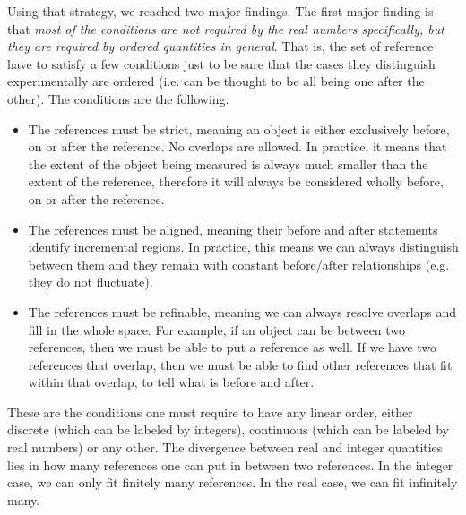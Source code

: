 \documentclass[12pt]{iopart}
\begin{document}
Using that strategy, we reached two major findings. The first major finding is that \emph{most of the conditions are not required by the real numbers specifically, but they are required by ordered quantities in general}. That is, the set of reference have to satisfy a few conditions just to be sure that the cases they distinguish experimentally are ordered (i.e. can be thought to be all being one after the other). The conditions are the following.
\begin{itemize}
	\item The references must be strict, meaning an object is either exclusively before, on or after the reference. No overlaps are allowed. In practice, it means that the extent of the object being measured is always much smaller than the extent of the reference, therefore it will always be considered wholly before, on or after the reference.
	\item The references must be aligned, meaning their before and after statements identify incremental regions. In practice, this means we can always distinguish between them and they remain with constant before/after relationships (e.g. they do not fluctuate).
	\item The references must be refinable, meaning we can always resolve overlaps and fill in the whole space. For example, if an object can be between two references, then we must be able to put a reference as well. If we have two references that overlap, then we must be able to find other references that fit within that overlap, to tell what is before and after.
\end{itemize}
These are the conditions one must require to have any linear order, either discrete (which can be labeled by integers), continuous (which can be labeled by real numbers) or any other. The divergence between real and integer quantities lies in how many references one can put in between two references. In the integer case, we can only fit finitely many references. In the real case, we can fit infinitely many.
\end{document}
